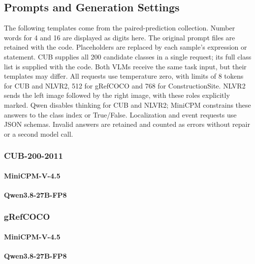 \clearpage
\subsection{Prompts and Generation Settings}
The following templates come from the paired-prediction collection. Number words for 4 and 16 are displayed as digits here. The original prompt files are retained with the code. Placeholders are replaced by each sample's expression or statement. CUB supplies all 200 candidate classes in a single request; its full class list is supplied with the code. Both VLMs receive the same task input, but their templates may differ. All requests use temperature zero, with limits of 8 tokens for CUB and NLVR2, 512 for gRefCOCO and 768 for ConstructionSite. NLVR2 sends the left image followed by the right image, with these roles explicitly marked. Qwen disables thinking for CUB and NLVR2; MiniCPM constrains these answers to the class index or True/False. Localization and event requests use JSON schemas. Invalid answers are retained and counted as errors without repair or a second model call.

\subsubsection{CUB-200-2011}
\paragraph{MiniCPM-V-4.5}
\paragraph{Qwen3.8-27B-FP8}

\subsubsection{gRefCOCO}
\paragraph{MiniCPM-V-4.5}
\paragraph{Qwen3.8-27B-FP8}

